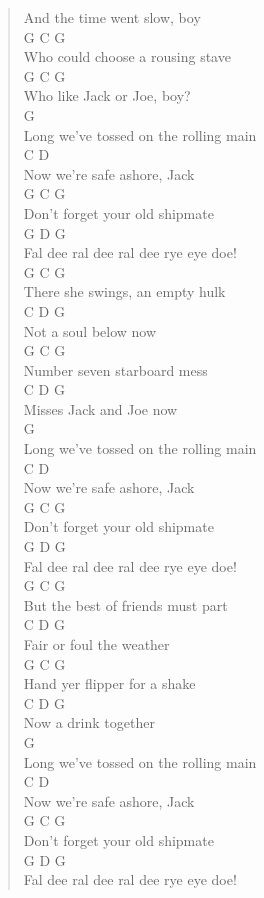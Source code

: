 \documentclass[11pt]{article}
\begin{document}
\begin{verse}
And the time went slow, boy\\
G                   C       G\\
Who could choose a rousing stave\\
G                     C      G\\
Who like Jack or Joe, boy?\\
G\\
Long we've tossed on the rolling main\\
C                D\\
Now we're safe ashore, Jack\\
G                  C      G\\
Don't forget your old shipmate\\
G                        D       G\\
Fal dee ral dee ral dee rye eye doe!\\
\vspace*{1em}
\vspace*{1em}
G                    C     G\\
There she swings, an empty hulk\\
C      D      G\\
Not a soul below now\\
G              C        G\\
Number seven starboard mess\\
C        D       G\\
Misses Jack and Joe now\\
G\\
Long we've tossed on the rolling main\\
C                D\\
Now we're safe ashore, Jack\\
G                  C      G\\
Don't forget your old shipmate\\
G                        D       G\\
Fal dee ral dee ral dee rye eye doe!\\
\vspace*{1em}
\vspace*{1em}
G                 C           G\\
But the best of friends must part\\
C        D        G\\
Fair or foul the weather\\
G                 C      G\\
Hand yer flipper for a shake\\
C       D      G\\
Now a drink together\\
G\\
Long we've tossed on the rolling main\\
C                D\\
Now we're safe ashore, Jack\\
G                  C      G\\
Don't forget your old shipmate\\
G                        D       G\\
Fal dee ral dee ral dee rye eye doe!\\
\end{verse}
\clearpage
\end{document}
